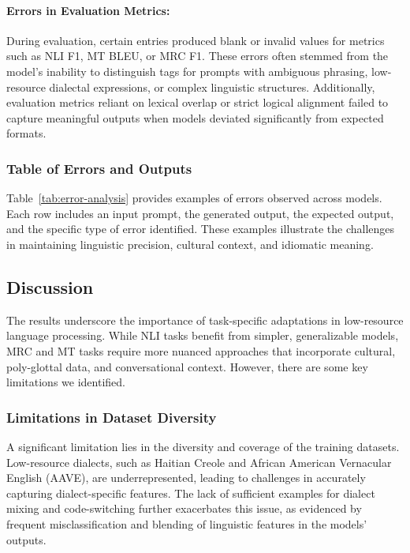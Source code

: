\paragraph{Errors in Evaluation Metrics:}
During evaluation, certain entries produced blank or invalid values for metrics such as NLI F1, MT BLEU, or MRC F1. These errors often stemmed from the model's inability to distinguish tags for prompts with ambiguous phrasing, low-resource dialectal expressions, or complex linguistic structures. Additionally, evaluation metrics reliant on lexical overlap or strict logical alignment failed to capture meaningful outputs when models deviated significantly from expected formats.

\subsubsection{Table of Errors and Outputs}
Table~\ref{tab:error-analysis} provides examples of errors observed across models. Each row includes an input prompt, the generated output, the expected output, and the specific type of error identified. These examples illustrate the challenges in maintaining linguistic precision, cultural context, and idiomatic meaning.


\subsection{Discussion}
The results underscore the importance of task-specific adaptations in low-resource language processing. While NLI tasks benefit from simpler, generalizable models, MRC and MT tasks require more nuanced approaches that incorporate cultural, poly-glottal data, and conversational context. However, there are some key limitations we identified. 



\subsubsection{Limitations in Dataset Diversity}
A significant limitation lies in the diversity and coverage of the training datasets. Low-resource dialects, such as Haitian Creole and African American Vernacular English (AAVE), are underrepresented, leading to challenges in accurately capturing dialect-specific features. The lack of sufficient examples for dialect mixing and code-switching further exacerbates this issue, as evidenced by frequent misclassification and blending of linguistic features in the models' outputs.

